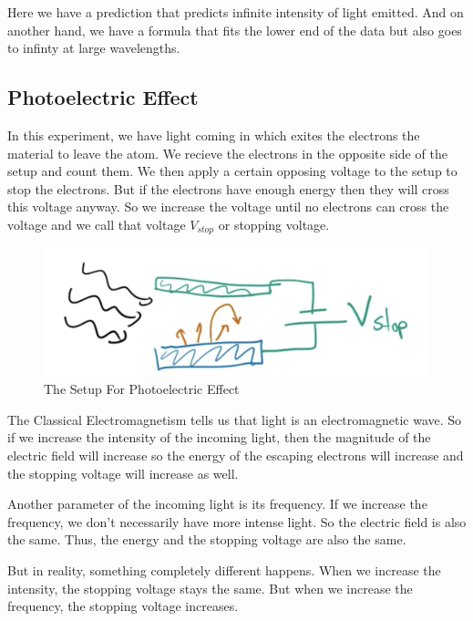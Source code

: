 Here we have a prediction that predicts infinite intensity of light emitted.
And on another hand, we have a formula that fits the lower end of the data but also goes to infinty at large wavelengths.

\pagebreak


\subsection{Photoelectric Effect}

In this experiment, we have light coming in which exites the electrons the material to leave the atom. We recieve the electrons in the opposite side of the setup and count them.
We then apply a certain opposing voltage to the setup to stop the electrons. But if the electrons have enough energy then they will cross this voltage anyway.
So we increase the voltage until no electrons can cross the voltage and we call that voltage $V_{stop}$ or stopping voltage.

\begin{figure}[ht!]
	\centering
	\includegraphics[scale=0.5]{./images/lecture_1_figure_2.png}
	\caption{The Setup For Photoelectric Effect}
\end{figure}

The Classical Electromagnetism tells us that light is an electromagnetic wave.
So if we increase the intensity of the incoming light, then the magnitude of the electric field will increase 
so the energy of the escaping electrons will increase and the stopping voltage will increase as well.

Another parameter of the incoming light is its frequency. 
If we increase the frequency, we don't necessarily have more intense light.
So the electric field is also the same. Thus, the energy and the stopping voltage are also the same.

But in reality, something completely different happens.
When we increase the intensity, the stopping voltage stays the same.
But when we increase the frequency, the stopping voltage increases.

